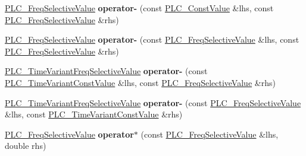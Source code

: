 \begin{DoxyCompactItemize}
\item 
\hypertarget{classns3_1_1PLC__FreqSelectiveValue_aa9ee019273c8fc22bd86d3b6210faa63}{\hyperlink{classns3_1_1PLC__FreqSelectiveValue}{\-P\-L\-C\-\_\-\-Freq\-Selective\-Value} {\bfseries operator-\/} (const \hyperlink{classns3_1_1PLC__ConstValue}{\-P\-L\-C\-\_\-\-Const\-Value} \&lhs, const \hyperlink{classns3_1_1PLC__FreqSelectiveValue}{\-P\-L\-C\-\_\-\-Freq\-Selective\-Value} \&rhs)}\label{classns3_1_1PLC__FreqSelectiveValue_aa9ee019273c8fc22bd86d3b6210faa63}

\item 
\hypertarget{classns3_1_1PLC__FreqSelectiveValue_a1d879b6e6cd1287246e44f1dd45e3f8c}{\hyperlink{classns3_1_1PLC__FreqSelectiveValue}{\-P\-L\-C\-\_\-\-Freq\-Selective\-Value} {\bfseries operator-\/} (const \hyperlink{classns3_1_1PLC__FreqSelectiveValue}{\-P\-L\-C\-\_\-\-Freq\-Selective\-Value} \&lhs, const \hyperlink{classns3_1_1PLC__FreqSelectiveValue}{\-P\-L\-C\-\_\-\-Freq\-Selective\-Value} \&rhs)}\label{classns3_1_1PLC__FreqSelectiveValue_a1d879b6e6cd1287246e44f1dd45e3f8c}

\item 
\hypertarget{classns3_1_1PLC__FreqSelectiveValue_a67c677f135b0983559bc0ac2960e4976}{\hyperlink{classns3_1_1PLC__TimeVariantFreqSelectiveValue}{\-P\-L\-C\-\_\-\-Time\-Variant\-Freq\-Selective\-Value} {\bfseries operator-\/} (const \hyperlink{classns3_1_1PLC__TimeVariantConstValue}{\-P\-L\-C\-\_\-\-Time\-Variant\-Const\-Value} \&lhs, const \hyperlink{classns3_1_1PLC__FreqSelectiveValue}{\-P\-L\-C\-\_\-\-Freq\-Selective\-Value} \&rhs)}\label{classns3_1_1PLC__FreqSelectiveValue_a67c677f135b0983559bc0ac2960e4976}

\item 
\hypertarget{classns3_1_1PLC__FreqSelectiveValue_a22bab1bb6d37a86e6bd3e6b979d911ea}{\hyperlink{classns3_1_1PLC__TimeVariantFreqSelectiveValue}{\-P\-L\-C\-\_\-\-Time\-Variant\-Freq\-Selective\-Value} {\bfseries operator-\/} (const \hyperlink{classns3_1_1PLC__FreqSelectiveValue}{\-P\-L\-C\-\_\-\-Freq\-Selective\-Value} \&lhs, const \hyperlink{classns3_1_1PLC__TimeVariantConstValue}{\-P\-L\-C\-\_\-\-Time\-Variant\-Const\-Value} \&rhs)}\label{classns3_1_1PLC__FreqSelectiveValue_a22bab1bb6d37a86e6bd3e6b979d911ea}

\item 
\hypertarget{classns3_1_1PLC__FreqSelectiveValue_a6581d0648a4e7f1d372f55e51791cedd}{\hyperlink{classns3_1_1PLC__FreqSelectiveValue}{\-P\-L\-C\-\_\-\-Freq\-Selective\-Value} {\bfseries operator$\ast$} (const \hyperlink{classns3_1_1PLC__FreqSelectiveValue}{\-P\-L\-C\-\_\-\-Freq\-Selective\-Value} \&lhs, double rhs)}\label{classns3_1_1PLC__FreqSelectiveValue_a6581d0648a4e7f1d372f55e51791cedd}


\end{DoxyCompactItemize}
